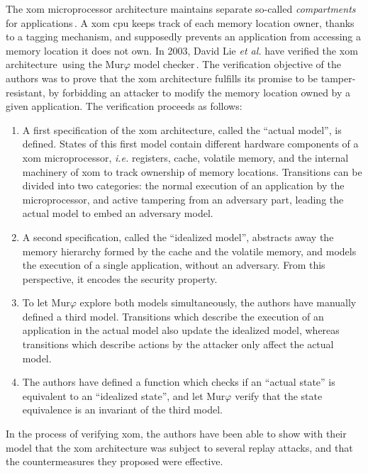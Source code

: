 The \ac{xom} microprocessor architecture maintains separate so-called
\emph{compartments} for applications\,\cite{lie2000architectural}.
%
A \ac{xom} \ac{cpu} keeps track of each memory location owner, thanks to a
tagging mechanism, and supposedly prevents an application from accessing a
memory location it does not own.
%
In 2003, David Lie \emph{et al.} have verified the \ac{xom}
architecture\,\cite{lie2003xom} using the Mur$\varphi$ model
checker\,\cite{murphi}.
%
The verification objective of the authors was to prove that the \ac{xom}
architecture fulfills its promise to be tamper-resistant, by forbidding an
attacker to modify the memory location owned by a given application.
%
The verification proceeds as follows:
%
\begin{enumerate}
\item A first specification of the \ac{xom} architecture, called the ``actual
  model'', is defined.
  States of this first model contain different hardware components of a \ac{xom}
  microprocessor, \emph{i.e.} registers, cache, volatile memory, and the
  internal machinery of \ac{xom} to track ownership of memory locations.
  Transitions can be divided into two categories: the normal execution of an
  application by the microprocessor, and active tampering from an adversary
  part, leading the actual model to embed an adversary model.
\item A second specification, called the ``idealized model'', abstracts away the
  memory hierarchy formed by the cache and the volatile memory, and models the
  execution of a single application, without an adversary.
  From this perspective, it encodes the security property.
\item To let Mur\( \varphi \) explore both models simultaneously, the authors
  have manually defined a third model.
  Transitions which describe the execution of an application in the actual model
  also update the idealized model, whereas transitions which describe actions by
  the attacker only affect the actual model.
\item The authors have defined a function which checks if an ``actual state'' is
  equivalent to an ``idealized state'', and let Mur\( \varphi \) verify that the
  state equivalence is an invariant of the third model.
\end{enumerate}
%
In the process of verifying \ac{xom}, the authors have been able to show with
their model that the \ac{xom} architecture was subject to several replay
attacks, and that the countermeasures they proposed were effective.
